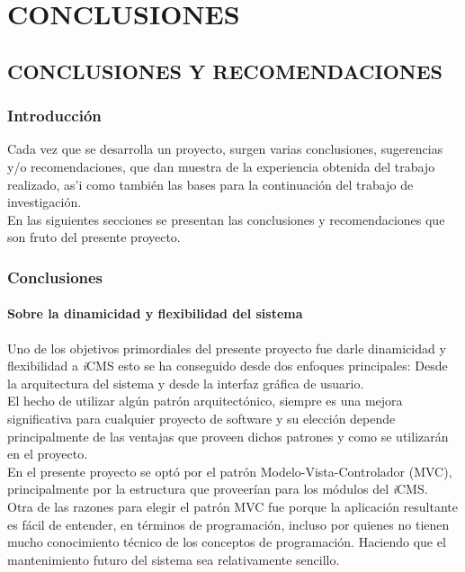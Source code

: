 \part{CONCLUSIONES}

\chapter{CONCLUSIONES Y RECOMENDACIONES}
\newpage

\section{Introducci\'on}
Cada vez que se desarrolla un proyecto, surgen varias conclusiones, sugerencias y/o recomendaciones, que dan muestra de la experiencia obtenida del trabajo realizado, as'i como tambi\'en las bases para la continuaci\'on del trabajo de investigaci\'on.\\
En las siguientes secciones se presentan las conclusiones y recomendaciones que son fruto del presente proyecto.

\section{Conclusiones}

\subsection{Sobre la dinamicidad y flexibilidad del sistema}
Uno de los objetivos primordiales del presente proyecto fue darle dinamicidad y flexibilidad a \textit{i}CMS esto se ha conseguido desde dos enfoques principales: Desde la arquitectura del sistema y desde la interfaz gr\'afica de usuario.\\

El hecho de utilizar alg\'un patr\'on arquitect\'onico, siempre es una mejora significativa para cualquier proyecto de software y su elecci\'on depende principalmente de las ventajas que proveen dichos patrones y como se utilizar\'an en el proyecto.\\

En el presente proyecto se opt\'o por el patr\'on Modelo-Vista-Controlador (MVC), principalmente por la estructura que proveer\'ian para los m\'odulos del \textit{i}CMS.\\
Otra de las razones para elegir el patr\'on MVC fue porque la aplicaci\'on resultante es f\'acil de entender, en t\'erminos de programaci\'on, incluso por quienes no tienen mucho conocimiento t\'ecnico de los conceptos de programaci\'on. Haciendo que el mantenimiento futuro del sistema sea relativamente sencillo.\\

